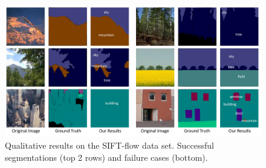 \begin{figure}
\begin{center}
	\includegraphics[width=1\linewidth]{Fig_SIFTflow.pdf}
\end{center}
   \caption{Qualitative results on the SIFT-flow data set. Successful segmentations (top 2 rows) and failure cases (bottom).}
\label{fig:SIFT-flow}
\end{figure}


